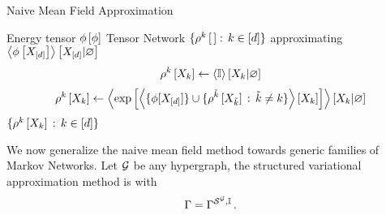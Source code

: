 \begin{algorithm}[h!]
    \caption{Naive Mean Field Approximation}\label{alg:NMF}
    \begin{algorithmic}
        \Require Energy tensor $\phi\left[\phi\right]$
        \Ensure Tensor Network $\{\rho^{k}\left[\,\right] : \, k\in[d]\}$ approximating $\left\langle \phi\left[X_{[d]}\right]\right\rangle \left[ X_{[d]} | \varnothing \right]$
        \iosepline
        \ForAll{$\catenumeratorin$}
            \State
            \begin{align*}
                \rho^{k}\left[X_{k}\right]
                \leftarrow \left\langle \mathbb{I}\right\rangle \left[ X_{k} | \varnothing \right]
            \end{align*}
        \EndFor
            \ForAll{$\catenumeratorin$}
                \State
                \[ \rho^{k}\left[X_{k}\right]
                \leftarrow \left\langle  \mathrm{exp}\left[ \left\langle  \{\phi[X_{[d]}] \}\cup
                \{\rho^{\tilde{k}}\left[X_{\tilde{k}}\right] \, : \, \tilde{k}\neq k\} \right\rangle \left[ X_{k} \right] \right]
                \right\rangle \left[ X_{k} | \varnothing \right] \]
            \EndFor
        \EndWhile
        \State \Return $\{\rho^{k}\left[X_{k}\right] \, : \, k\in[d]\}$
    \end{algorithmic}
\end{algorithm}




We now generalize the naive mean field method towards generic families of Markov Networks.
Let $\mathcal{G}$ be any hypergraph, the structured variational approximation method is  with
\begin{align*}
    \Gamma = \Gamma^{\mathcal{S}^{\mathcal{G}},\mathbb{I}} \, .
\end{align*}


